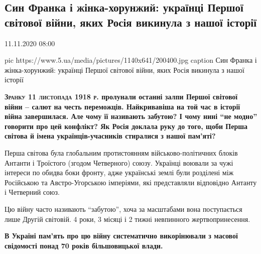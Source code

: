  
 
 

\subsection{Син Франка і жінка-хорунжий: українці Першої світової війни, яких Росія викинула з нашої історії}
\label{sec:11_11_2020.news.ua.5ua.1.syn_ivana_franka}
11.11.2020 08:00



\ifcmt
pic https://www.5.ua/media/pictures/1140x641/200400.jpg
caption Син Франка і жінка-хорунжий: українці Першої світової війни, яких Росія викинула з нашої історії
\fi

{
\bfseries
\lettrine[lines=3]{З}{ранку 11 листопада 1918 р.} пролунали останні залпи Першої світової війни –
салют на честь переможців. Найкривавіша на той час в історії війна завершилася.
Але чому її називають забутою? І чому нині \enquote{не модно} говорити про цей
конфлікт? Як Росія доклала руку до того, щоби Перша світова й імена
українців-учасників стиралися з нашої пам'яті?
}

Перша світова була глобальним протистоянням військово-політичних блоків Антанти
і Троїстого (згодом Четверного) союзу. Українці воювали за чужі інтереси по
обидва боки фронту, адже українські землі були розділені між Російською та
Австро-Угорською імперіями, які представляли відповідно Антанту і Четверний
союз.

Цю війну часто називають \enquote{забутою}, хоча за масштабами вона поступається лише
Другій світовій. 4 роки, 3 місяці і 2 тижні невпинного жертвопринесення.

\begin{leftbar}
	\bfseries
В Україні пам'ять про цю війну систематично викорінювали з масової свідомості
понад 70 років більшовицької влади.
\end{leftbar}

